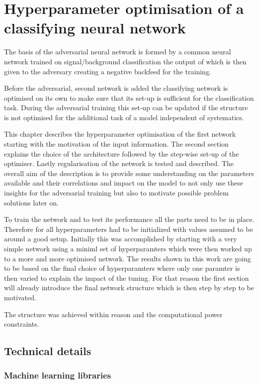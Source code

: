 \chapter{Hyperparameter optimisation of a classifying neural network}
\label{chp:simpleNN}

The basis of the adversarial neural network is formed by a common neural network trained on signal/background classification the output of which is then given to the adversary creating a negative backfeed for the training.

Before the adversarial, second network is added the classifying network is optimised on its own to make sure that its set-up is sufficient for the classification task.
During the adversarial training this set-up can be updated if the structure is not optimised for the additional task of a model independent of systematics.

This chapter describes the hyperparameter optimisation of the first network starting with the motivation  of the input information.
The second section explains the choice of the architecture followed by the step-wise set-up of the optimiser.
Lastly regularisation of the network is tested and described.
The overall aim of the description is to provide some understanding on the parameters available and their correlations and impact on the model to not only use these insights for the adversarial training but also to motivate possible problem solutions later on.


To train the network and to test its performance all the parts need to be in place. Therefore for all hyperparameters had to be initialized with values assumed to be around a good setup. Initially this was accomplished by starting with a very simple network using a miniml set of hyperparamters which were then worked up to a more and more optimised network. The results shown in this work are going to be based on the final choice of hyperparamters where only one paramter is then varied to explain the impact of the tuning. For that reason the first section will already introduce the final network structure which is then step by step to be motivated.

The structure was achieved within reason and the computational power constraints.


\section{Technical details}

\subsection{Machine learning libraries}

